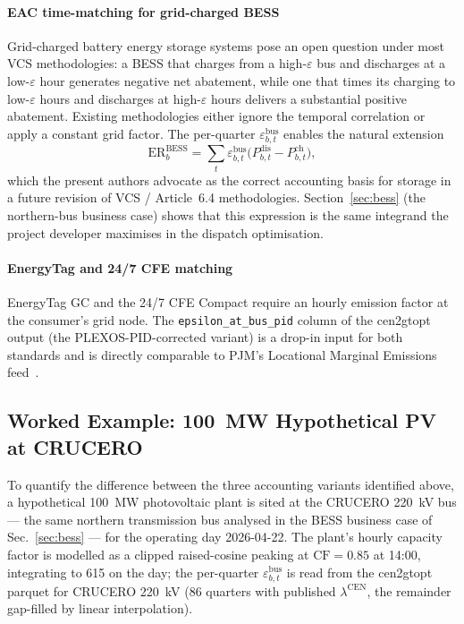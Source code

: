 \paragraph{EAC time-matching for grid-charged BESS}
Grid-charged battery energy storage systems pose an open question
under most VCS methodologies: a BESS that charges from a
high-$\varepsilon$ bus and discharges at a low-$\varepsilon$ hour
generates negative net abatement, while one that times its charging
to low-$\varepsilon$ hours and discharges at high-$\varepsilon$ hours
delivers a substantial positive abatement.  Existing methodologies
either ignore the temporal correlation or apply a constant grid
factor.  The per-quarter $\varepsilon^{\mathrm{bus}}_{b,t}$ enables
the natural extension
\begin{equation}
\mathrm{ER}^{\mathrm{BESS}}_b =
  \sum_t \varepsilon^{\mathrm{bus}}_{b,t}
         \bigl(P^{\mathrm{dis}}_{b,t} - P^{\mathrm{ch}}_{b,t}\bigr),
\label{eq:er-bess}
\end{equation}
which the present authors advocate as the correct accounting basis
for storage in a future revision of VCS / Article~6.4 methodologies.
Section~\ref{sec:bess} (the northern-bus business case) shows that
this expression is the same integrand the project developer
maximises in the dispatch optimisation.

\paragraph{EnergyTag and 24/7 CFE matching}
EnergyTag GC and the 24/7 CFE Compact require an hourly emission
factor at the consumer's grid node.  The
\texttt{epsilon\_at\_bus\_pid} column of the cen2gtopt output (the
PLEXOS-PID-corrected variant) is a drop-in input for both standards
and is directly comparable to PJM's Locational Marginal Emissions
feed~\cite{PJMLME2024}.

\subsection{Worked Example: 100~MW Hypothetical PV at CRUCERO}
\label{sec:credits-worked}

To quantify the difference between the three accounting variants
identified above, a hypothetical 100~MW photovoltaic plant is sited
at the CRUCERO 220~kV bus — the same northern transmission bus
analysed in the BESS business case of Sec.~\ref{sec:bess} — for the
operating day 2026-04-22.  The plant's hourly capacity factor is
modelled as a clipped raised-cosine peaking at $\mathrm{CF}=0.85$ at
14:00, integrating to \SI{615}{\MWh} on the day; the per-quarter
$\varepsilon^{\mathrm{bus}}_{b,t}$ is read from the cen2gtopt
parquet for CRUCERO 220~kV (86 quarters with published
$\lambda^{\mathrm{CEN}}$, the remainder gap-filled by linear
interpolation).

